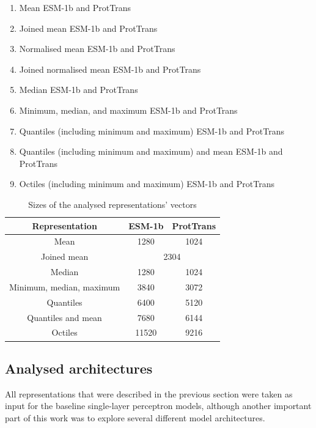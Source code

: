 \documentclass[12pt]{article}
\begin{document}
	\begin{enumerate}
		\item Mean ESM-1b and ProtTrans 
		\item Joined mean ESM-1b and ProtTrans
		\item Normalised mean ESM-1b and ProtTrans
		\item Joined normalised mean ESM-1b and ProtTrans
		\item Median ESM-1b and ProtTrans
		\item Minimum, median, and maximum ESM-1b and ProtTrans
		\item Quantiles (including minimum and maximum) ESM-1b and ProtTrans
		\item Quantiles (including minimum and maximum) and mean ESM-1b and ProtTrans
		\item Octiles (including minimum and maximum) ESM-1b and ProtTrans
	\end{enumerate}

    \newpage

	\begin{table}[h!]
		\caption{Sizes of the analysed representations' vectors}
		\vspace{0.2cm}
		\centering
		\begin{tabular}{ | c | c c | }
			\hline 
			Representation & ESM-1b & ProtTrans \\
			\hline 
			Mean & 1280 & 1024 \\
			Joined mean & \multicolumn{2}{c|}{2304} \\
			Median & 1280 & 1024 \\
			Minimum, median, maximum & 3840 & 3072 \\
			Quantiles & 6400 & 5120 \\
			Quantiles and mean & 7680 & 6144 \\
			Octiles & 11520 & 9216 \\
			\hline    
		\end{tabular}
		\label{table:vectorsDimensions}
	\end{table}

	\newpage

	\subsection{Analysed architectures}

	All representations that were described
	in the previous section were taken as input for the baseline
	single-layer perceptron models, although another important part 
	of this work was to explore several different 
	model architectures. 
\end{document}
